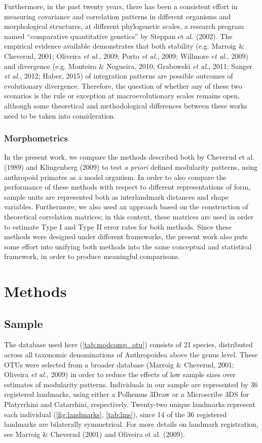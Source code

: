 \documentclass[12pt,]{article}
\begin{document}
Furthermore, in the past twenty years, there has been a consistent
effort in measuring covariance and correlation patterns in different
organisms and morphological structures, at different phylogenetic
scales, a research program named ``comparative quantitative genetics''
by Steppan et al. (2002). The empirical evidence available demonstrates
that both stability (e.g. Marroig \& Cheverud, 2001; Oliveira \emph{et
al.}, 2009; Porto \emph{et al.}, 2009; Willmore \emph{et al.}, 2009) and
divergence (e.g. Monteiro \& Nogueira, 2010; Grabowski \emph{et al.},
2011; Sanger \emph{et al.}, 2012; Haber, 2015) of integration patterns
are possible outcomes of evolutionary divergence. Therefore, the
question of whether any of these two scenarios is the rule or exception
at macroevolutionary scales remains open, although some theoretical and
methodological differences between these works need to be taken into
consideration.

\subsubsection{Morphometrics}\label{morphometrics}

In the present work, we compare the methods described both by Cheverud
et al. (1989) and Klingenberg (2009) to test \emph{a priori} defined
modularity patterns, using anthropoid primates as a model organism. In
order to also compare the performance of these methods with respect to
different representations of form, sample units are represented both as
interlandmark distances and shape variables. Furthermore, we also used
an approach based on the construction of theoretical correlation
matrices; in this context, these matrices are used in order to estimate
Type I and Type II error rates for both methods. Since these methods
were designed under different frameworks, the present work also puts
some effort into unifying both methods into the same conceptual and
statistical framework, in order to produce meaningful comparisons.

\section{Methods}\label{methods}

\subsection{Sample}\label{sample}

The database used here (\autoref{tab:modcomp_otu}) consists of 21
species, distributed across all taxonomic denominations of Anthropoidea
above the genus level. These OTUs were selected from a broader database
(Marroig \& Cheverud, 2001; Oliveira \emph{et al.}, 2009) in order to
reduce the effects of low sample sizes over estimates of modularity
patterns. Individuals in our sample are represented by 36 registered
landmarks, using either a Polhemus 3Draw or a Microscribe 3DS for
Platyrrhini and Catarrhini, respectively. Twenty-two unique landmarks
represent each individual (\autoref{fig:landmarks}, \autoref{tab:lms}),
since 14 of the 36 registered landmarks are bilaterally symmetrical. For
more details on landmark registration, see Marroig \& Cheverud (2001)
and Oliveira et al. (2009).
\end{document}
